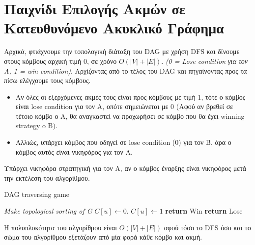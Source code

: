 \documentclass[a4paper,11pt]{article}
\begin{document}
\renewcommand{\labelenumi}{\roman{enumi})}
\renewcommand{\labelenumii}{ (\arabic{enumii}) }



\section{Παιχνίδι Επιλογής Ακμών σε Κατευθυνόμενο Ακυκλικό Γράφημα}
\setcounter{section}{1}

Αρχικά, φτιάχνουμε την τοπολογική διάταξη του DAG με χρήση DFS και δίνουμε
στους κόμβους αρχική τιμή 0, σε χρόνο $O(|V| + |E|)$. \emph{(0 = Lose
condition για τον Α, 1 = win condition)}. Αρχίζοντας από το τέλος του DAG και
πηγαίνοντας προς τα πίσω ελέγχουμε τους κόμβους.
\begin{itemize}
\item
Αν όλες οι εξερχόμενες ακμές τους είναι προς κόμβους με τιμή 1, τότε ο κόμβος
είναι lose condition για τον Α, οπότε σημειώνεται με 0 (Αφού αν βρεθεί σε
τέτοιο κόμβο ο Α, θα αναγκαστεί να προχωρήσει σε κόμβο που θα έχει winning
strategy o B).
\item
Αλλιώς, υπάρχει κόμβος που οδηγεί σε lose condition (0) για τον Β, άρα ο κόμβος
αυτός είναι νικηφόρος για τον Α.
\end{itemize}

Υπάρχει νικηφόρα στρατηγική για τον Α, αν ο κόμβος έναρξης είναι νικηφόρος
μετά την εκτέλεση του αλγορίθμου.

\begin{algorithm}[H]
\caption{DAG traversing game}
\begin{algorithmic}[1]
	\State \emph{Make topological sorting of G}
		\State $C[u] \gets 0$.
	\EndFor
				\State $C[u] \gets 1$
			\EndIf
		\EndFor
	\EndFor
		\State \textbf{return} Win
	\Else
		\State \textbf{return} Lose
	\EndIf
\EndProcedure
\end{algorithmic}
\end{algorithm}

Η πολυπλοκότητα του αλγορίθμου είναι $O(|V| + |E|)$ αφού τόσο το DFS όσο και
το σώμα του αλγορίθμου εξετάζουν από μία φορά κάθε κόμβο και ακμή.

\end{document}
